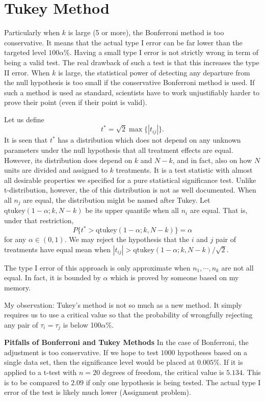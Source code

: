 \section{Tukey Method}
Particularly when $k$ is large (5 or more), the Bonferroni method is too conservative.
It means that the actual type I error can be far lower than the targeted level $100\alpha\%$.
Having a small type I error is not strictly wrong in term of being a valid test. 
The real drawback of such a test is that this increases the type II error. 
When $k$ is large, the statistical power of detecting any departure from
the null hypothesis is too small if the conservative Bonferroni method is used. 
If such a method is used as standard, scientists have to work 
unjustifiably harder to prove their point (even if their point is valid).

Let us define
\[
t^* = \sqrt{2} \max \{ |t_{ij}| \}.
\]
It is seen that $t^*$ has a distribution which does not depend on 
any unknown parameters under the null hypothesis that all
treatment effects are equal. However, its distribution does depend on $k$ and $N-k$, 
and in fact, also on how $N$ units are divided and assigned to $k$
treatments. 
It is a test statistic with almost all desirable properties
we specified for a pure statistical significance test.
Unlike t-distribution, however,
the \cdf of this distribution is not as well documented.
When all $n_j$ are equal, the distribution might be named after Tukey.
Let $\text{qtukey}(1- \alpha; k, N-k)$ be its upper quantile  when all $n_i$ are equal. 
That is, under that restriction,
\[
P\{ t^* > \text{qtukey}(1- \alpha; k, N-k) \} = \alpha
\]
for any $\alpha \in (0, 1)$.
We may reject the hypothesis 
that the $i$ and $j$ pair of treatments have equal mean
when $|t_{ij}| > \text{qtukey}(1- \alpha; k, N-k)/\sqrt{2}$. 

The type I error of this approach is only approximate 
when $n_1, \cdots, n_k$ are
not all equal. In fact, it is bounded by $\alpha$ which
is proved by someone based on my memory.

My observation: Tukey's method is not so much as a new method.
It simply requires us to use a critical value so that the
probability of wrongfully rejecting any pair of $\tau_i = \tau_j$
is below 100$\alpha$\%.

\vs \noindent
{\bf Pitfalls of Bonferroni and Tukey Methods}
In the case of Bonferroni, the adjustment is too conservative.
If we hope to test $1000$ hypotheses based on a single data
set, then the significance level would be placed at $0.005\%$.
If it is applied to a t-test with $n=20$ degrees of freedom,
the critical value is $5.134$. This is to be compared to $2.09$
if only one hypothesis is being tested.
The actual type I error of the test is likely
much lower (Assignment problem).

